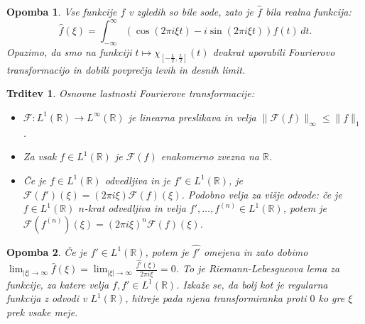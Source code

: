 \documentclass[10pt, a4paper]{article}
\newtheorem{trditev}[izr]{Trditev}
\newtheorem*{opomba}{Opomba}
\newcommand{\R}{\mathbb {R}}
\newcommand{\F}{\mathcal{F}}
\begin{document}
\begin{opomba}
    Vse funkcije $f$ v zgledih so bile sode, zato je $\hat{f}$ bila realna funkcija:
    $$\hat{f} (\xi) = \int_{-\infty} ^\infty (\cos (2 \pi i \xi t) - i \sin (2 \pi i \xi t)) f(t)\, dt.$$ 
    Opazimo, da smo na funkciji $t \mapsto \chi_{\left[-\frac{L}{2}, \frac{L}{2}\right]} (t)$
    dvakrat uporabili Fourierovo transformacijo in dobili povprečja levih in desnih limit.
\end{opomba}

\begin{trditev}
    Osnovne lastnosti Fourierove transformacije:
    \begin{itemize}
        \item $\F: L^1 (\R) \to L^\infty (\R)$ je linearna preslikava in velja $\| \F (f)\|_{\infty} \leq \|f\|_1$.
        \item Za vsak $f \in L^1 (\R)$ je $\F (f)$ enakomerno zvezna na $\R$.
        \item Če je $f \in L^1 (\R)$ odvedljiva in je $f' \in L^1 (\R)$, je 
        $\F (f') (\xi) = (2 \pi i \xi) \F (f) (\xi)$. Podobno velja za višje odvode: če je $f \in L^1 (\R)$ 
        $n$-krat odvedljiva in velja $f', \dots, f^{(n)} \in L^1 (\R)$, potem je
        $\F (f^{(n)}) (\xi) = (2 \pi i \xi)^n \F (f) (\xi)$.
    \end{itemize}
\end{trditev}

\begin{opomba}
    Če je $f' \in L^1 (\R)$, potem je $\widehat{f'}$ omejena in zato dobimo 
    $\lim_{|\xi| \to \infty} \hat{f}(\xi) = \lim_{|\xi| \to \infty} \frac{\widehat{f'} (\xi)}{2 \pi i \xi} = 0$.
    To je Riemann-Lebesgueova lema za funkcije, za katere velja $f, f' \in L^1 (\R)$.
    Izkaže se, da bolj kot je regularna funkcija z odvodi v $L^1 (\R)$, hitreje pada njena transformiranka proti 
    $0$ ko gre $\xi$ prek vsake meje.
\end{opomba}
\end{document}
